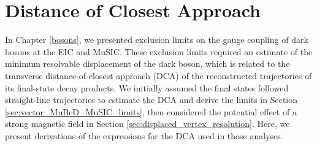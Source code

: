 \chapter{Distance of Closest Approach}	\label{dca_appendix}

In Chapter \ref{bosons}, we presented exclusion limits on the gauge coupling of dark bosons at the EIC and MuSIC. These exclusion limits required an estimate of the minimum resolvable displacement of the dark boson, which is related to the transverse distance-of-closest approach (DCA) of the reconstructed trajectories of its final-state decay products. We initially assumed the final states followed straight-line trajectories to estimate the DCA and derive the limits in Section \ref{sec:vector_MuBeD_MuSIC_limits}, then considered the potential effect of a strong magnetic field in Section \ref{sec:displaced_vertex_resolution}. Here, we present derivations of the expressions for the DCA used in those analyses. 

